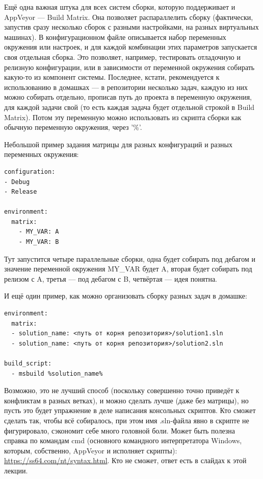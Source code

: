 \documentclass[a5paper]{article}
\begin{document}
Ещё одна важная штука для всех систем сборки, которую поддерживает и AppVeyor --- Build Matrix. Она позволяет распараллелить сборку (фактически, запустив сразу несколько сборок с разными настройками, на разных виртуальных машинах). В конфигурационном файле описывается набор переменных окружения или настроек, и для каждой комбинации этих параметров запускается своя отдельная сборка. Это позволяет, например, тестировать отладочную и релизную конфигурации, или в зависимости от переменной окружения собирать какую-то из компонент системы. Последнее, кстати, рекомендуется к использованию в домашках --- в репозитории несколько задач, каждую из них можно собирать отдельно, прописав путь до проекта в переменную окружения, для каждой задачи свой (то есть каждая задача будет отдельной строкой в Build Matrix). Потом эту переменную можно использовать из скрипта сборки как обычную переменную окружения, через '\%'.

Небольшой пример задания матрицы для разных конфигураций и разных переменных окружения:

\begin{verbatim}
configuration:
- Debug
- Release

environment:
  matrix:
    - MY_VAR: A
    - MY_VAR: B
\end{verbatim}

Тут запустится четыре параллельные сборки, одна будет собирать под дебагом и значение переменной окружения MY\_VAR будет A, вторая будет собирать под релизом с A, третья --- под дебагом с B, четвёртая --- идея понятна.

И ещё один пример, как можно организовать сборку разных задач в домашке:

\begin{verbatim}
environment:
  matrix:
  - solution_name: <путь от корня репозитория>/solution1.sln
  - solution_name: <путь от корня репозитория>/solution2.sln

build_script:
  - msbuild %solution_name%
\end{verbatim}

Возможно, это не лучший способ (поскольку совершенно точно приведёт к конфликтам в разных ветках), и можно сделать лучше (даже без матрицы), но пусть это будет упражнение в деле написания консольных скриптов. Кто сможет сделать так, чтобы всё собиралось, при этом имя .sln-файла явно в скрипте не фигурировало, сэкономит себе много головной боли. Может быть полезна справка по командам cmd (основного командного интерпретатора Windows, которым, собственно, AppVeyor и исполняет скрипты): \url{https://ss64.com/nt/syntax.html}. Кто не сможет, ответ есть в слайдах к этой лекции.
\end{document}
